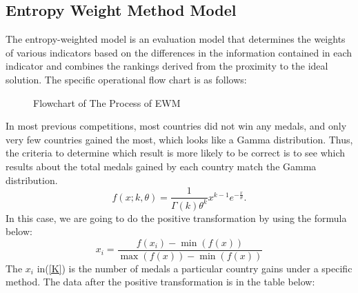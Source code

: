 \documentclass{mcmthesis}
\begin{document}
\subsection{Entropy Weight Method Model}
The entropy-weighted model is an evaluation model that determines the weights of various indicators based on the differences in the information contained in each indicator and combines the rankings derived from the proximity to the ideal solution. The specific operational flow chart is as follows:
\begin{figure}[H]
\centering
{}
\caption{Flowchart of The Process of EWM}
\label{fig:flowchart}
\end{figure}
In most previous competitions, most countries did not win any medals, and only very few countries gained the most, which looks like a Gamma distribution. Thus, the criteria to determine which result is more likely to be correct is to see which results about the total medals gained by each country match the Gamma distribution.\\
\begin{equation}\label{eq:1}
f(x;k,\theta) =\frac{1}{\Gamma(k) \theta^k}x^{k-1}e^{-\frac{x}{\theta}}.
\end{equation}
In this case, we are going to do the positive transformation by using the formula below:
\begin{equation}\label{K}
x_i = \frac{f(x_i) - \min(f(x))}{\max(f(x)) - \min(f(x))}
\end{equation}
The $x_i$ in(\ref{K}) is the number of medals a particular country gains under a specific method. The data after the positive transformation is in the table below:
\end{document}
